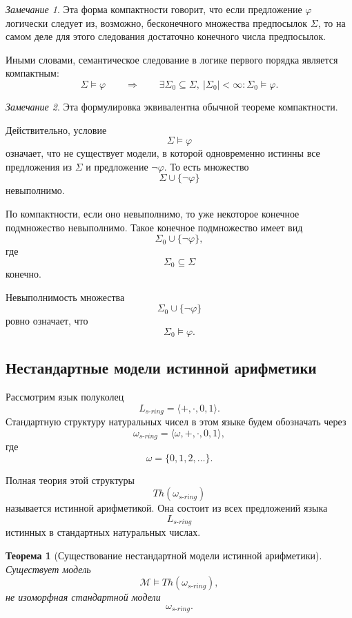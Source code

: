 \documentclass[12pt,a4paper,oneside,openany]{book}
\theoremstyle{definition}
\theoremstyle{plain}
\newtheorem{theorem}{Теорема}[chapter]
\theoremstyle{remark}
\newtheorem{remark}{Замечание}[chapter]
\begin{document}
\begin{remark}
Эта форма компактности говорит, что если предложение $\varphi$ логически следует из, возможно, бесконечного множества предпосылок $\Sigma$, то на самом деле для этого следования достаточно конечного числа предпосылок.

Иными словами, семантическое следование в логике первого порядка является компактным:
\[
\Sigma\models\varphi
\qquad
\Longrightarrow
\qquad
\exists \Sigma_0\subseteq\Sigma,\ |\Sigma_0|<\infty:
\Sigma_0\models\varphi.
\]
\end{remark}

\begin{remark}
Эта формулировка эквивалентна обычной теореме компактности.

Действительно, условие
\[
\Sigma\models\varphi
\]
означает, что не существует модели, в которой одновременно истинны все предложения из $\Sigma$ и предложение $\neg\varphi$. То есть множество
\[
\Sigma\cup\{\neg\varphi\}
\]
невыполнимо.

По компактности, если оно невыполнимо, то уже некоторое конечное подмножество невыполнимо. Такое конечное подмножество имеет вид
\[
\Sigma_0\cup\{\neg\varphi\},
\]
где
\[
\Sigma_0\subseteq\Sigma
\]
конечно.

Невыполнимость множества
\[
\Sigma_0\cup\{\neg\varphi\}
\]
ровно означает, что
\[
\Sigma_0\models\varphi.
\]
\end{remark}


\subsection{Нестандартные модели истинной арифметики}

Рассмотрим язык полуколец
\[
L_{s\text{-}ring}
=
\langle +,\cdot,0,1\rangle.
\]
Стандартную структуру натуральных чисел в этом языке будем обозначать через
\[
\omega_{s\text{-}ring}
=
\langle \omega,+,\cdot,0,1\rangle,
\]
где
\[
\omega=\{0,1,2,\ldots\}.
\]

Полная теория этой структуры
\[
Th(\omega_{s\text{-}ring})
\]
называется истинной арифметикой. Она состоит из всех предложений языка
\[
L_{s\text{-}ring}
\]
истинных в стандартных натуральных числах.

\begin{theorem}[Существование нестандартной модели истинной арифметики]
Существует модель
\[
\mathcal M\models Th(\omega_{s\text{-}ring}),
\]
не изоморфная стандартной модели
\[
\omega_{s\text{-}ring}.
\]
\end{theorem}
\end{document}
